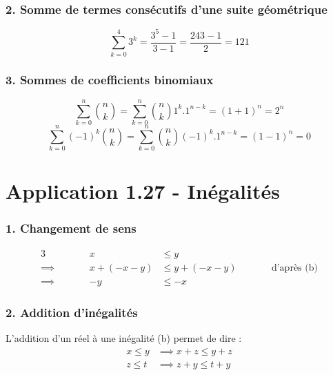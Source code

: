 \documentclass{report}
\begin{document}
\subsubsection*{2. Somme de termes consécutifs d'une suite géométrique}
\begin{displaymath}
\sum_{k = 0}^{4} 3^k = \frac{3^5-1}{3-1}=\frac{243-1}{2}=121
\end{displaymath}


\subsubsection*{3. Sommes de coefficients binomiaux} 
\begin{displaymath}
	\sum_{k = 0}^{n} \binom{n}{k} = \sum_{k = 0}^{n} \binom{n}{k} 1^k . 1^{n-k} = (1+1)^n = 2^n
\end{displaymath}
\begin{displaymath}
	\sum_{k = 0}^{n} (-1)^k \binom{n}{k} = \sum_{k = 0}^{n} \binom{n}{k} (-1)^k . 1^{n-k} = (1-1)^n = 0
\end{displaymath}


\section*{Application 1.27 - Inégalités}

\subsubsection*{1. Changement de sens}
\begin{alignat*}{3}
	        &         &          x &\leq y \\
	\implies& \qquad  &   x+(-x-y) &\leq y+(-x-y) &\qquad& \text{d'après (b)}\\
	\implies&         &         -y &\leq -x
\end{alignat*}


\subsubsection*{2. Addition d'inégalités}

L'addition d'un réel à une inégalité (b) permet de dire :
\begin{displaymath}
	\begin{split}
x \leq y & \implies x  + z\leq y + z \\
z \leq t & \implies z + y \leq t + y
	\end{split}
\end{displaymath}
\end{document}
